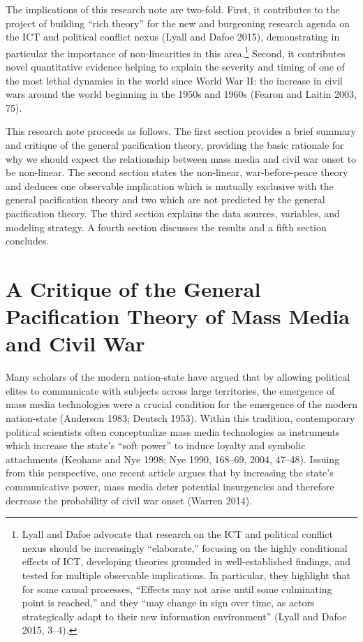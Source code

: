 \documentclass[11pt,article,oneside]{memoir}
\begin{document}
The implications of this research note are two-fold. First, it
contributes to the project of building ``rich theory'' for the new and
burgeoning research agenda on the ICT and political conflict nexus
(Lyall and Dafoe 2015), demonstrating in particular the importance of
non-linearities in this area.\footnote{Lyall and Dafoe advocate that
  research on the ICT and political conflict nexus should be
  increasingly ``elaborate,'' focusing on the highly conditional effects
  of ICT, developing theories grounded in well-established findings, and
  tested for multiple observable implications. In particular, they
  highlight that for some causal processes, ``Effects may not arise
  until some culminating point is reached,'' and they ``may change in
  sign over time, as actors strategically adapt to their new information
  environment'' (Lyall and Dafoe 2015, 3--4).} Second, it contributes
novel quantitative evidence helping to explain the severity and timing
of one of the most lethal dynamics in the world since World War II: the
increase in civil wars around the world beginning in the 1950s and 1960s
(Fearon and Laitin 2003, 75).

This research note proceeds as follows. The first section provides a
brief summary and critique of the general pacification theory, providing
the basic rationale for why we should expect the relationship between
mass media and civil war onset to be non-linear. The second section
states the non-linear, war-before-peace theory and deduces one
observable implication which is mutually exclusive with the general
pacification theory and two which are not predicted by the general
pacification theory. The third section explains the data sources,
variables, and modeling strategy. A fourth section discusses the results
and a fifth section concludes.

\section{A Critique of the General Pacification Theory of Mass Media and
Civil
War}\label{a-critique-of-the-general-pacification-theory-of-mass-media-and-civil-war}

Many scholars of the modern nation-state have argued that by allowing
political elites to communicate with subjects across large territories,
the emergence of mass media technologies were a crucial condition for
the emergence of the modern nation-state (Anderson 1983; Deutsch 1953).
Within this tradition, contemporary political scientists often
conceptualize mass media technologies as instruments which increase the
state's ``soft power'' to induce loyalty and symbolic attachments
(Keohane and Nye 1998; Nye 1990, 168--69, 2004, 47--48). Issuing from
this perspective, one recent article argues that by increasing the
state's communicative power, mass media deter potential insurgencies and
therefore decrease the probability of civil war onset (Warren 2014).
\end{document}

